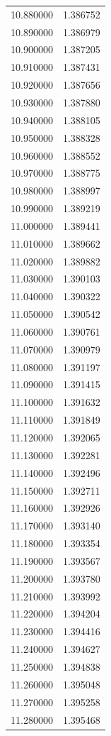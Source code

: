 \begin{tabular}{rr}
10.880000 & 1.386752 \\
10.890000 & 1.386979 \\
10.900000 & 1.387205 \\
10.910000 & 1.387431 \\
10.920000 & 1.387656 \\
10.930000 & 1.387880 \\
10.940000 & 1.388105 \\
10.950000 & 1.388328 \\
10.960000 & 1.388552 \\
10.970000 & 1.388775 \\
10.980000 & 1.388997 \\
10.990000 & 1.389219 \\
11.000000 & 1.389441 \\
11.010000 & 1.389662 \\
11.020000 & 1.389882 \\
11.030000 & 1.390103 \\
11.040000 & 1.390322 \\
11.050000 & 1.390542 \\
11.060000 & 1.390761 \\
11.070000 & 1.390979 \\
11.080000 & 1.391197 \\
11.090000 & 1.391415 \\
11.100000 & 1.391632 \\
11.110000 & 1.391849 \\
11.120000 & 1.392065 \\
11.130000 & 1.392281 \\
11.140000 & 1.392496 \\
11.150000 & 1.392711 \\
11.160000 & 1.392926 \\
11.170000 & 1.393140 \\
11.180000 & 1.393354 \\
11.190000 & 1.393567 \\
11.200000 & 1.393780 \\
11.210000 & 1.393992 \\
11.220000 & 1.394204 \\
11.230000 & 1.394416 \\
11.240000 & 1.394627 \\
11.250000 & 1.394838 \\
11.260000 & 1.395048 \\
11.270000 & 1.395258 \\
11.280000 & 1.395468 \\

\end{tabular}
